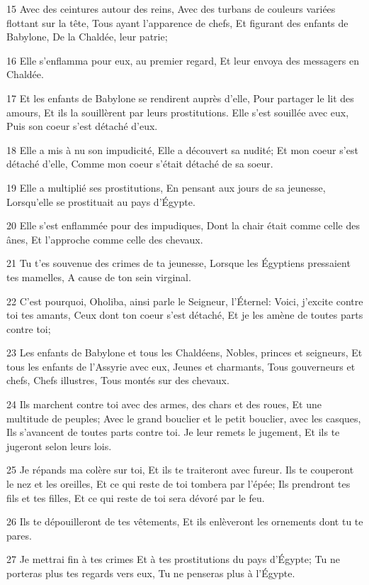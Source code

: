 \par 15 Avec des ceintures autour des reins, Avec des turbans de couleurs variées flottant sur la tête, Tous ayant l'apparence de chefs, Et figurant des enfants de Babylone, De la Chaldée, leur patrie;
\par 16 Elle s'enflamma pour eux, au premier regard, Et leur envoya des messagers en Chaldée.
\par 17 Et les enfants de Babylone se rendirent auprès d'elle, Pour partager le lit des amours, Et ils la souillèrent par leurs prostitutions. Elle s'est souillée avec eux, Puis son coeur s'est détaché d'eux.
\par 18 Elle a mis à nu son impudicité, Elle a découvert sa nudité; Et mon coeur s'est détaché d'elle, Comme mon coeur s'était détaché de sa soeur.
\par 19 Elle a multiplié ses prostitutions, En pensant aux jours de sa jeunesse, Lorsqu'elle se prostituait au pays d'Égypte.
\par 20 Elle s'est enflammée pour des impudiques, Dont la chair était comme celle des ânes, Et l'approche comme celle des chevaux.
\par 21 Tu t'es souvenue des crimes de ta jeunesse, Lorsque les Égyptiens pressaient tes mamelles, A cause de ton sein virginal.
\par 22 C'est pourquoi, Oholiba, ainsi parle le Seigneur, l'Éternel: Voici, j'excite contre toi tes amants, Ceux dont ton coeur s'est détaché, Et je les amène de toutes parts contre toi;
\par 23 Les enfants de Babylone et tous les Chaldéens, Nobles, princes et seigneurs, Et tous les enfants de l'Assyrie avec eux, Jeunes et charmants, Tous gouverneurs et chefs, Chefs illustres, Tous montés sur des chevaux.
\par 24 Ils marchent contre toi avec des armes, des chars et des roues, Et une multitude de peuples; Avec le grand bouclier et le petit bouclier, avec les casques, Ils s'avancent de toutes parts contre toi. Je leur remets le jugement, Et ils te jugeront selon leurs lois.
\par 25 Je répands ma colère sur toi, Et ils te traiteront avec fureur. Ils te couperont le nez et les oreilles, Et ce qui reste de toi tombera par l'épée; Ils prendront tes fils et tes filles, Et ce qui reste de toi sera dévoré par le feu.
\par 26 Ils te dépouilleront de tes vêtements, Et ils enlèveront les ornements dont tu te pares.
\par 27 Je mettrai fin à tes crimes Et à tes prostitutions du pays d'Égypte; Tu ne porteras plus tes regards vers eux, Tu ne penseras plus à l'Égypte.
